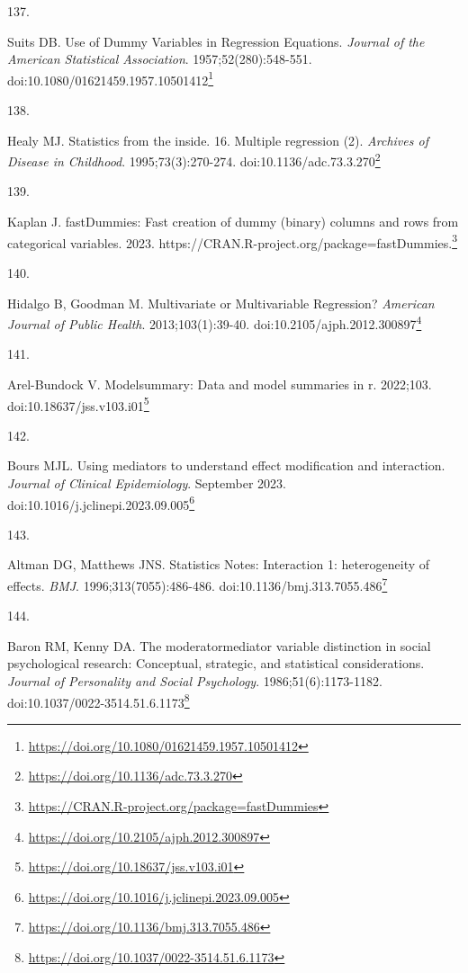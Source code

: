 \documentclass[
  a4paper,
]{book}
\newlength{\cslhangindent}
\newlength{\csllabelwidth}
\newlength{\cslentryspacingunit} %
\newenvironment{CSLReferences}[2] %
 {%
  \setlength{\parindent}{0pt}
  \ifodd #1
  \let\oldpar\par
  \def\par{\hangindent=\cslhangindent\oldpar}
  \fi
  \setlength{\parskip}{#2\cslentryspacingunit}
 }%
 {}
\newcommand{\CSLLeftMargin}[1]{\parbox[t]{\csllabelwidth}{#1}}
\newcommand{\CSLRightInline}[1]{\parbox[t]{\linewidth - \csllabelwidth}{#1}\break}
\renewcommand{\href}[2]{#2\footnote{\url{#1}}}
\begin{document}
\begin{CSLReferences}{0}{0}
\leavevmode{}%
\CSLLeftMargin{137. }%
\CSLRightInline{Suits DB. Use of Dummy Variables in Regression Equations. \emph{Journal of the American Statistical Association}. 1957;52(280):548-551. doi:\href{https://doi.org/10.1080/01621459.1957.10501412}{10.1080/01621459.1957.10501412}}

\leavevmode{}%
\CSLLeftMargin{138. }%
\CSLRightInline{Healy MJ. Statistics from the inside. 16. Multiple regression (2). \emph{Archives of Disease in Childhood}. 1995;73(3):270-274. doi:\href{https://doi.org/10.1136/adc.73.3.270}{10.1136/adc.73.3.270}}

\leavevmode{}%
\CSLLeftMargin{139. }%
\CSLRightInline{Kaplan J. fastDummies: Fast creation of dummy (binary) columns and rows from categorical variables. 2023. \href{https://CRAN.R-project.org/package=fastDummies}{https://CRAN.R-project.org/package=fastDummies.}}

\leavevmode{}%
\CSLLeftMargin{140. }%
\CSLRightInline{Hidalgo B, Goodman M. Multivariate or Multivariable Regression? \emph{American Journal of Public Health}. 2013;103(1):39-40. doi:\href{https://doi.org/10.2105/ajph.2012.300897}{10.2105/ajph.2012.300897}}

\leavevmode{}%
\CSLLeftMargin{141. }%
\CSLRightInline{Arel-Bundock V. {\textbraceleft}Modelsummary{\textbraceright}: Data and model summaries in {\textbraceleft}r{\textbraceright}. 2022;103. doi:\href{https://doi.org/10.18637/jss.v103.i01}{10.18637/jss.v103.i01}}

\leavevmode{}%
\CSLLeftMargin{142. }%
\CSLRightInline{Bours MJL. Using mediators to understand effect modification and interaction. \emph{Journal of Clinical Epidemiology}. September 2023. doi:\href{https://doi.org/10.1016/j.jclinepi.2023.09.005}{10.1016/j.jclinepi.2023.09.005}}

\leavevmode{}%
\CSLLeftMargin{143. }%
\CSLRightInline{Altman DG, Matthews JNS. Statistics Notes: Interaction 1: heterogeneity of effects. \emph{BMJ}. 1996;313(7055):486-486. doi:\href{https://doi.org/10.1136/bmj.313.7055.486}{10.1136/bmj.313.7055.486}}

\leavevmode{}%
\CSLLeftMargin{144. }%
\CSLRightInline{Baron RM, Kenny DA. The moderator{\textendash}mediator variable distinction in social psychological research: Conceptual, strategic, and statistical considerations. \emph{Journal of Personality and Social Psychology}. 1986;51(6):1173-1182. doi:\href{https://doi.org/10.1037/0022-3514.51.6.1173}{10.1037/0022-3514.51.6.1173}}


\end{CSLReferences}
\end{document}
